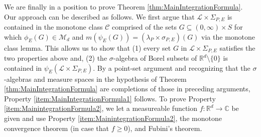 \documentclass[11pt, letter]{book}
\begin{document}
\noindent We are finally in a position to prove Theorem \ref{thm:MainIntegrationFormula}. Our approach can be described as follows. We first argue that $\mathcal{L}\times \Sigma_{P,E}$ is contained in the monotone class $\mathcal{C}$ comprised of the sets $G\subseteq (0,\infty)\times S$ for which $\phi_E(G) \in \mathcal{M}_d$ and $m(\psi_E(G)) = (\lambda_P \times \sigma_{P,E})(G)$ via the monotone class lemma. This allows us to show that (1) every set $G$ in $\mathcal{L}\times \Sigma_{P,E}$ satisfies the two properties above and, (2) the $\sigma$-algebra of Borel subsets of $\mathbb{R}^d\setminus\{ 0\}$ is contained in $\psi_E(\mathcal{L}\times \Sigma_{P,E})$. By a point-set argument and recognizing that the $\sigma$-algebras and measure spaces in the hypothesis of Theorem \ref{thm:MainIntegrationFormula} are completions of those in preceding arguments, Property \ref{item:MainIntegrationFormula1} follows. To prove Property \ref{item:MainintegrationFormula2}, we let a measureable function $f: \mathbb{R}^d \to \mathbb{C}$ be given and use Property \ref{item:MainintegrationFormula2}, the monotone convergence theorem (in case that $f\geq 0$), and Fubini's theorem.   
 
\end{document}
